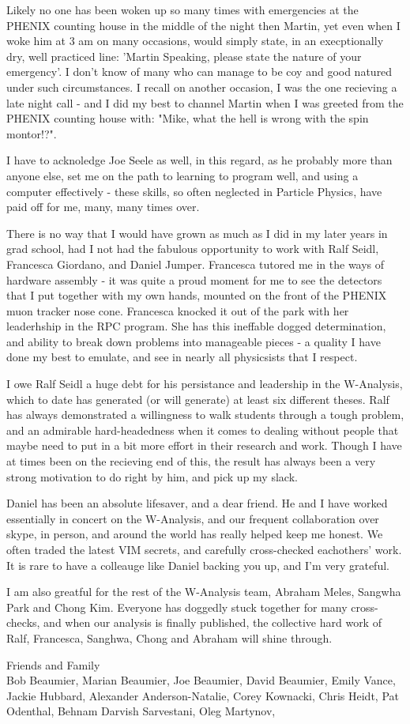 Likely no one has been woken up so many times with emergencies at the PHENIX
counting house in the middle of the night then Martin, yet even when I woke him
at 3 am on many occasions, would simply state, in an execptionally dry, well
practiced line: 'Martin Speaking, please state the nature of your emergency'. I
don't know of many who can manage to be coy and good natured under such
circumstances. I recall on another occasion, I was the one recieving a late
night call - and I did my best to channel Martin when I was greeted from the
PHENIX counting house with: "Mike, what the hell is wrong with the spin
montor!?".

I have to acknoledge Joe Seele as well, in this regard, as he probably more
than anyone else, set me on the path to learning to program well, and using a
computer effectively - these skills, so often neglected in Particle Physics,
have paid off for me, many, many times over.

There is no way that I would have grown as much as I did in my later years in
grad school, had I not had the fabulous opportunity to work with Ralf Seidl,
Francesca Giordano, and Daniel Jumper. Francesca tutored me in the ways of
hardware assembly - it was quite a proud moment for me to see the detectors
that I put together with my own hands, mounted on the front of the PHENIX muon
tracker nose cone. Francesca knocked it out of the park with her leaderhship in
the RPC program. She has this ineffable dogged determination, and ability to
break down problems into manageable pieces - a quality I have done my best to
emulate, and see in nearly all physicsists that I respect.

I owe Ralf Seidl a huge debt for his persistance and leadership in the
W-Analysis, which to date has generated (or will generate) at least six
different theses. Ralf has always demonstrated a willingness to walk students
through a tough problem, and an admirable hard-headedness when it comes to
dealing without people that maybe need to put in a bit more effort in their
research and work. Though I have at times been on the recieving end of this, the
result has always been a very strong motivation to do right by him, and pick up
my slack.

Daniel has been an absolute lifesaver, and a dear friend. He and I have worked
essentially in concert on the W-Analysis, and our frequent collaboration over
skype, in person, and around the world has really helped keep me honest.  We
often traded the latest VIM secrets, and carefully cross-checked eachothers'
work. It is rare to have a colleauge like Daniel backing you up, and I'm very
grateful.

I am also greatful for the rest of the W-Analysis team, Abraham Meles, Sangwha
Park and Chong Kim. Everyone has doggedly stuck together for many cross-checks,
and when our analysis is finally published, the collective hard work of Ralf,
Francesca, Sanghwa, Chong and Abraham will shine through.

Friends and Family \\
  Bob Beaumier, 
  Marian Beaumier, 
  Joe Beaumier, 
  David Beaumier, 
  Emily Vance, 
  Jackie Hubbard, 
  Alexander Anderson-Natalie, 
  Corey Kownacki, 
  Chris Heidt, 
  Pat Odenthal, 
  Behnam Darvish Sarvestani, 
  Oleg Martynov, 
